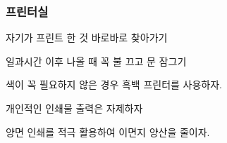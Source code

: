 \subsubsection{프린터실}
\begin{packed_item}
\item 자기가 프린트 한 것 바로바로 찾아가기
\item 일과시간 이후 나올 때 꼭 불 끄고 문 잠그기
\item 색이 꼭 필요하지 않은 경우 흑백 프린터를 사용하자.
\item 개인적인 인쇄물 출력은 자제하자
\item 양면 인쇄를 적극 활용하여 이면지 양산을 줄이자.
\end{packed_item}


